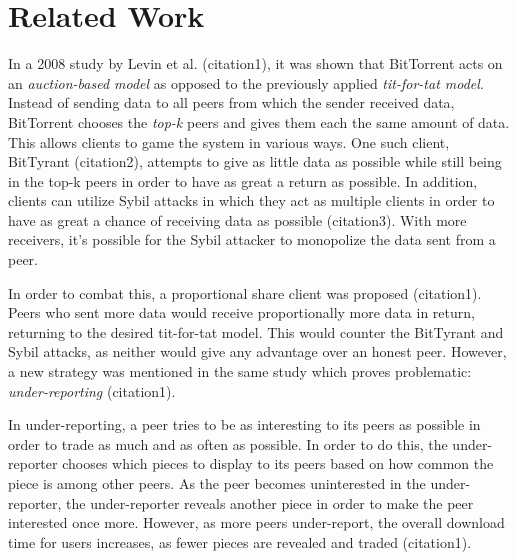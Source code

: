 \section{Related Work}


In a 2008 study by Levin et al. (citation1), it was shown that BitTorrent acts on an \textit{auction-based model} as opposed to the previously applied \textit{tit-for-tat model}. Instead of sending data to all peers from which the sender received data, BitTorrent chooses the \textit{top-k} peers and gives them each the same amount of data. This allows clients to game the system in various ways. One such client, BitTyrant (citation2), attempts to give as little data as possible while still being in the top-k peers in order to have as great a return as possible. In addition, clients can utilize Sybil attacks in which they act as multiple clients in order to have as great a chance of receiving data as possible (citation3). With more receivers, it's possible for the Sybil attacker to monopolize the data sent from a peer.

In order to combat this, a proportional share client was proposed (citation1). Peers who sent more data would receive proportionally more data in return, returning to the desired tit-for-tat model. This would counter the BitTyrant and Sybil attacks, as neither would give any advantage over an honest peer. However, a new strategy was mentioned in the same study which proves problematic: \textit{under-reporting} (citation1).

In under-reporting, a peer tries to be as interesting to its peers as possible in order to trade as much and as often as possible. In order to do this, the under-reporter chooses which pieces to display to its peers based on how common the piece is among other peers. As the peer becomes uninterested in the under-reporter, the under-reporter reveals another piece in order to make the peer interested once more. However, as more peers under-report, the overall download time for users increases, as fewer pieces are revealed and traded (citation1).


